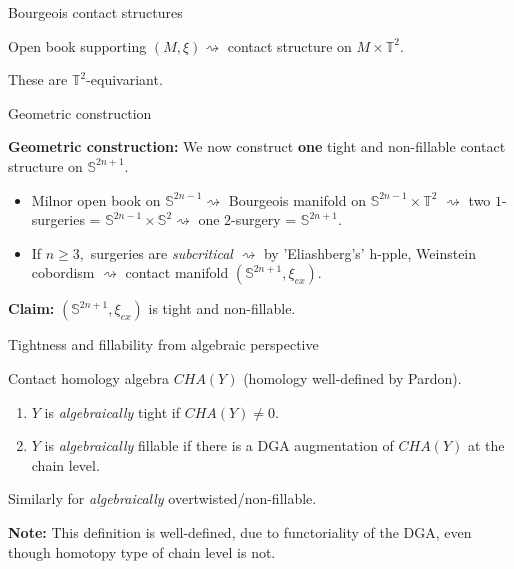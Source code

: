 \documentclass{beamer}
\begin{document}
\begin{frame}{Bourgeois contact structures}
    \begin{theorem}[Bourgeois '02]
    Open book supporting $(M,\xi)\rightsquigarrow$ contact structure on $M\times \mathbb T^2$.
    \end{theorem}

 These are $\mathbb T^2$-equivariant.   
    
\end{frame}

\begin{frame}{Geometric construction}
    
    \textbf{Geometric construction:} We now construct \textbf{one} tight and non-fillable contact structure on $\mathbb S^{2n+1}$.
    
    \medskip
    
    \pause

    \begin{itemize}
        \item Milnor open book on $\mathbb S^{2n-1}\rightsquigarrow$ Bourgeois manifold on $\mathbb S^{2n-1}\times \mathbb T^2$
    $\rightsquigarrow $ two $1$-surgeries = $\mathbb S^{2n-1}\times \mathbb S^2 \rightsquigarrow$ one $2$-surgery = $\mathbb S^{2n+1}.$
    
    \medskip

    \pause
    
    \item If $n\geq 3,$ surgeries are \emph{subcritical} $\rightsquigarrow$ by 'Eliashberg's' h-pple, Weinstein cobordism $\rightsquigarrow$ contact manifold $(\mathbb S^{2n+1},\xi_{ex})$.

    \end{itemize}

    \pause
    
    \medskip

    \begin{tcolorbox}
    \textbf{Claim:} $(\mathbb S^{2n+1},\xi_{ex})$ is tight and non-fillable.
    \end{tcolorbox}
    
\end{frame}

\begin{frame}{Tightness and fillability from algebraic perspective}

Contact homology algebra $CHA(Y)$ (homology well-defined by Pardon).

\begin{definition}

\begin{enumerate}
    \item $Y$ is \emph{algebraically} tight if $CHA(Y)\neq 0$.
    \item $Y$ is \emph{algebraically} fillable if there is a DGA augmentation of $CHA(Y)$ at the chain level.
\end{enumerate} 
Similarly for \emph{algebraically} overtwisted/non-fillable.
\end{definition}

\textbf{Note:} This definition is well-defined, due to functoriality of the DGA, even though homotopy type of chain level is not.
\end{frame}
\end{document}
